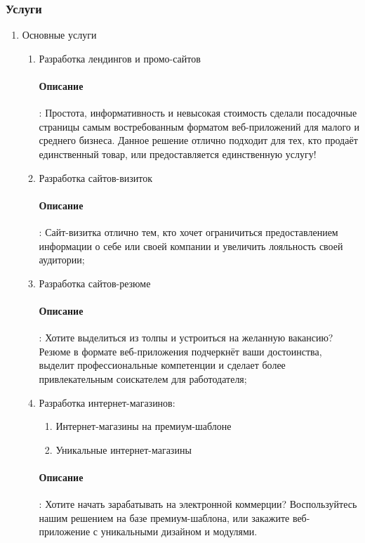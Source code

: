 \subsubsection{Услуги}
\begin{enumerate}
  \item Основные услуги
  \begin{enumerate}
    \item Разработка лендингов и промо-сайтов
      \paragraph{Описание}: Простота, информативность и невысокая стоимость сделали посадочные страницы самым востребованным форматом веб-приложений для малого и среднего бизнеса. Данное решение отлично подходит для тех, кто продаёт единственный товар, или предоставляется единственную услугу!

    \item Разработка сайтов-визиток
      \paragraph{Описание}: Сайт-визитка отлично тем, кто хочет ограничиться предоставлением информации о себе или своей компании и увеличить лояльность своей аудитории;

    \item Разработка сайтов-резюме
      \paragraph{Описание}: Хотите выделиться из толпы и устроиться на желанную вакансию? Резюме в формате веб-приложения подчеркнёт ваши достоинства, выделит профессиональные компетенции и сделает более привлекательным соискателем для работодателя;

    \item Разработка интернет-магазинов:
      \begin{enumerate}
        \item Интернет-магазины на премиум-шаблоне
        \item Уникальные интернет-магазины
      \end{enumerate}
      \paragraph{Описание}: Хотите начать зарабатывать на электронной коммерции? Воспользуйтесь нашим решением на базе премиум-шаблона, или закажите веб-приложение с уникальными дизайном и модулями.


\end{enumerate}
\end{enumerate}
